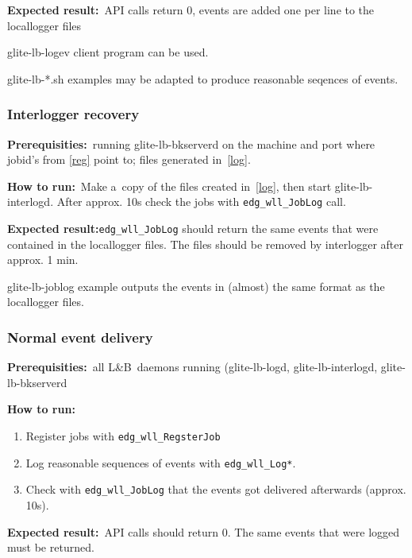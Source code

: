 \documentclass{egee}
\def\LB{L\&B}
\def\req{\noindent\textbf{Prerequisities:}}
\def\how{\noindent\textbf{How to run:}}
\def\result{\noindent\textbf{Expected result:}}
\def\path#1{{\normalfont\textsf{#1}}}
\def\code#1{\texttt{#1}}
\begin{document}
\result\ API calls return 0, events are added one per line to the locallogger files

\begin{hints}
\path{glite-lb-logev} client program can be used.

\path{glite-lb-*.sh} examples may be adapted to produce reasonable seqences
of events.
\end{hints}

\subsubsection{Interlogger recovery}
\label{recover}
\req\ running \path{glite-lb-bkserverd} on the machine and port where 
jobid's from \ref{reg} point to; files generated in~\ref{log}.

\how\ Make a~copy of the files created in~\ref{log}, then start
\path{glite-lb-interlogd}. After approx. 10s check the jobs
with \code{edg\_wll\_JobLog} call. 

\result \code{edg\_wll\_JobLog} should return the same events that were
contained in the locallogger files. The files should be removed by 
interlogger after approx. 1 min.

\begin{hints}
\path{glite-lb-joblog} example outputs the events in (almost) the same
format as the locallogger files.
\end{hints}

\subsubsection{Normal event delivery}
\label{normal}
\req\ all \LB\ daemons running (\path{glite-lb-logd}, \path{glite-lb-interlogd},
\path{glite-lb-bkserverd}

\how\
\begin{enumerate}

\item Register jobs with \code{edg\_wll\_RegsterJob} 
\item Log reasonable sequences of events with \code{edg\_wll\_Log*}.
\item Check with \code{edg\_wll\_JobLog}
that the events got delivered afterwards (approx. 10s).
\end{enumerate}

\result\ API calls should return 0. The same events that were logged must be returned.
\end{document}
